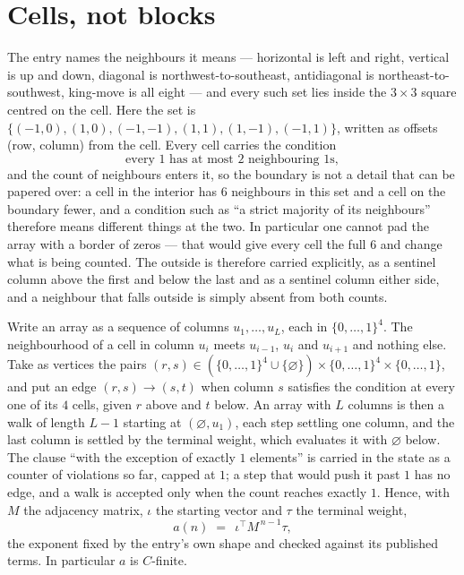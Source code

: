 \documentclass[11pt,a4paper]{article}
\theoremstyle{plain}
\theoremstyle{definition}
\begin{document}
\section{Cells, not blocks}

The entry names the neighbours it means --- horizontal is left and right, vertical is up and
down, diagonal is northwest-to-southeast, antidiagonal is northeast-to-southwest, king-move is
all eight --- and every such set lies inside the $3\times3$ square centred on the cell. Here
the set is $\{(-1,0), (1,0), (-1,-1), (1,1), (1,-1), (-1,1)\}$, written as offsets (row, column) from the cell. Every cell carries
the condition
\[
\text{every 1 has at most 2 neighbouring 1s},
\]
and the count of neighbours enters it, so the boundary is not a detail that can be papered
over: a cell in the interior has $6$ neighbours in this set and a cell on the boundary
fewer, and a condition such as ``a strict majority of its neighbours'' therefore means
different things at the two. In particular one cannot pad the array with a border of zeros ---
that would give every cell the full $6$ and change what is being counted. The outside is
therefore carried
explicitly, as a sentinel column above the first and below the last and as a sentinel column
either side, and a neighbour that falls outside is simply absent from both counts.

Write an array as a sequence of columns $u_1,\dots,u_L$, each in
$\{0,\dots,1\}^{4}$. The neighbourhood of a cell in column $u_i$ meets $u_{i-1}$,
$u_i$ and $u_{i+1}$ and nothing else. Take as vertices the pairs
$(r,s)\in(\{0,\dots,1\}^{4}\cup\{\varnothing\})\times\{0,\dots,1\}^{4} \times \{0,\dots,1\}$,
and put an edge $(r,s)\to(s,t)$ when column $s$ satisfies the condition at every one of its
$4$ cells, given $r$ above and $t$ below. An array with $L$ columns is then a walk of length
$L-1$ starting at $(\varnothing,u_1)$, each step settling one column, and the last column is
settled by the terminal weight, which evaluates it with $\varnothing$ below. The clause ``with the exception of exactly $1$ elements'' is carried in
the state as a counter of violations so far, capped at $1$; a step that would push it past
$1$ has no edge, and a walk is accepted only when the count reaches exactly $1$. Hence,
with $M$ the adjacency matrix, $\iota$ the starting vector and $\tau$ the terminal weight,
\[
a(n)\;=\;\,\iota^{\!\top}M^{\,n-1}\tau ,
\]
the exponent fixed by the entry's own shape and checked against its published terms. In
particular $a$ is $C$-finite.
\end{document}
